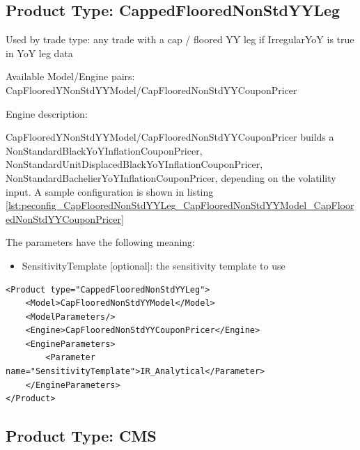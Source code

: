 \subsection{Product Type: CappedFlooredNonStdYYLeg}

Used by trade type: any trade with a cap / floored YY leg if IrregularYoY is true in YoY leg data

Available Model/Engine pairs: CapFlooredYNonStdYYModel/CapFlooredNonStdYYCouponPricer

Engine description:

CapFlooredYNonStdYYModel/CapFlooredNonStdYYCouponPricer builds a NonStandardBlackYoYInflationCouponPricer,
NonStandardUnitDisplacedBlackYoYInflationCouponPricer, NonStandardBachelierYoYInflationCouponPricer, depending on the
volatility input. A sample configuration is shown in listing
\ref{lst:peconfig_CapFlooredNonStdYYLeg_CapFlooredNonStdYYModel_CapFlooredNonStdYYCouponPricer}

The parameters have the following meaning:

\begin{itemize}
\item SensitivityTemplate [optional]: the sensitivity template to use
\end{itemize}

\begin{longlisting}
\begin{verbatim}
<Product type="CappedFlooredNonStdYYLeg">
    <Model>CapFlooredNonStdYYModel</Model>
    <ModelParameters/>
    <Engine>CapFlooredNonStdYYCouponPricer</Engine>
    <EngineParameters>
        <Parameter name="SensitivityTemplate">IR_Analytical</Parameter>
    </EngineParameters>
</Product>
\end{verbatim}
\caption{Configuration for Product CapFlooredNonStdYYLeg, Model CapFlooredNonStdYYModel, Engine
  CapFlooredNonStdYYCouponPricer}
\label{lst:peconfig_CapFlooredNonStdYYLeg_CapFlooredNonStdYYModel_CapFlooredNonStdYYCouponPricer}
\end{longlisting}

\subsection{Product Type: CMS}

